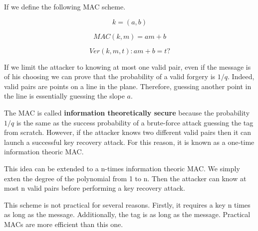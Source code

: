 If we define the following MAC scheme.

\begin{equation*}
  k = (a, b)
\end{equation*}

\begin{equation*}
  MAC(k, m) = am + b
\end{equation*}

\begin{equation*}
  Ver(k, m, t): am + b = t?
\end{equation*}

If we limit the attacker to knowing at most one valid pair, even if the message is of his choosing we can prove that the probability of a valid forgery is $1/q$.
Indeed, valid pairs are points on a line in the plane. Therefore, guessing another point in the line is essentially guessing the slope $a$.

The MAC is called \textbf{information theoretically secure} because the probability $1/q$ is the same as the success probability of a brute-force attack guessing the tag from scratch.
However, if the attacker knows two different valid pairs then it can launch a successful key recovery attack.
For this reason, it is known as a one-time information theoric MAC.

This idea can be extended to a n-times information theoric MAC.
We simply exten the degree of the polynomial from 1 to n.
Then the attacker can know at most n valid pairs before performing a key recovery attack.

This scheme is not practical for several reasons.
Firstly, it requires a key n times as long as the message.
Additionally, the tag is as long as the message.
Practical MACs are more efficient than this one.
